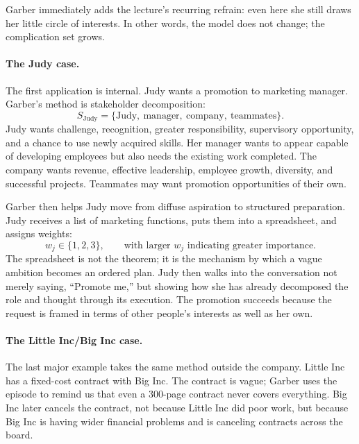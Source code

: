 Garber immediately adds the lecture's recurring refrain: even here she still draws her little circle of interests. In other words, the model does not change; the complication set grows.

\paragraph{The Judy case.} The first application is internal. Judy wants a promotion to marketing manager. Garber's method is stakeholder decomposition:
\begin{equation}
S_{\text{Judy}} = \{\text{Judy},\ \text{manager},\ \text{company},\ \text{teammates}\}.
\end{equation}
Judy wants challenge, recognition, greater responsibility, supervisory opportunity, and a chance to use newly acquired skills. Her manager wants to appear capable of developing employees but also needs the existing work completed. The company wants revenue, effective leadership, employee growth, diversity, and successful projects. Teammates may want promotion opportunities of their own.

Garber then helps Judy move from diffuse aspiration to structured preparation. Judy receives a list of marketing functions, puts them into a spreadsheet, and assigns weights:
\begin{equation}
w_j \in \{1,2,3\}, \qquad \text{with larger } w_j \text{ indicating greater importance.}
\end{equation}
The spreadsheet is not the theorem; it is the mechanism by which a vague ambition becomes an ordered plan. Judy then walks into the conversation not merely saying, ``Promote me,'' but showing how she has already decomposed the role and thought through its execution. The promotion succeeds because the request is framed in terms of other people's interests as well as her own.

\paragraph{The Little Inc/Big Inc case.} The last major example takes the same method outside the company. Little Inc has a fixed-cost contract with Big Inc. The contract is vague; Garber uses the episode to remind us that even a 300-page contract never covers everything. Big Inc later cancels the contract, not because Little Inc did poor work, but because Big Inc is having wider financial problems and is canceling contracts across the board.

